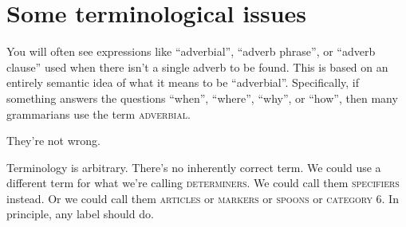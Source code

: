 \ea
    \ea{} \label{tree:b+mtryharder1}
    \ex{} \label{tree:b+mtryharder2}
    \z
\z
{}

\section{Some terminological issues} \label{sec:terminology}

You will often see expressions like ``adverbial'', ``adverb phrase'', or ``adverb clause'' used when there isn't a single adverb to be found. This is based on an entirely semantic idea of what it means to be ``adverbial''. Specifically, if something answers the questions ``when'', ``where'', ``why'', or ``how'', then many grammarians use the term \textsc{adverbial}.

They're not wrong.

Terminology is arbitrary. There's no inherently correct term. We could use a different term for what we're calling \textsc{determiners}. We could call them \textsc{specifiers} instead. Or we could call them \textsc{articles} or \textsc{markers} or \textsc{spoons} or \textsc{category 6}. In principle, any label should do.

